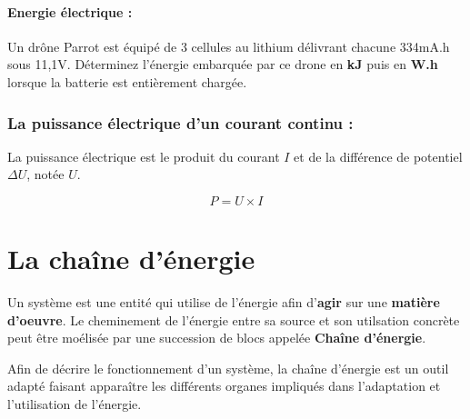 \documentclass[10pt,fleqn]{article} %
\begin{document}
\begin{defi}
  \paragraph{Energie électrique : } 
\end{defi}


\begin{exemple}
    

Un drône Parrot est équipé de 3 cellules au lithium délivrant chacune 334mA.h sous 11,1V. Déterminez l'énergie embarquée par ce drone en \textbf{kJ} puis en \textbf{W.h} lorsque la batterie est entièrement chargée. 

\afaire {}

\correction {}

\end{exemple}

\subsubsection{La puissance électrique d'un courant continu : }
La puissance électrique est le produit du courant \textbf{$I$} et de la différence de potentiel $\Delta U$, notée \textbf{$U$}. 

\begin{equation*}
    P = U\times I
\end{equation*}
\pagebreak
\section{La chaîne d'énergie}
Un système est une entité qui utilise de l'énergie afin d'\textbf{agir} sur une \textbf{matière d'oeuvre}. Le cheminement de l'énergie entre sa source et son utilsation concrète peut être moélisée par une succession de blocs appelée \textbf{Chaîne d'énergie}.

\begin{obj}
  Afin de décrire le fonctionnement d'un système, la chaîne d'énergie est un outil adapté faisant apparaître les différents organes impliqués dans l'adaptation et l'utilisation de l'énergie.
\end{obj}
\end{document}
